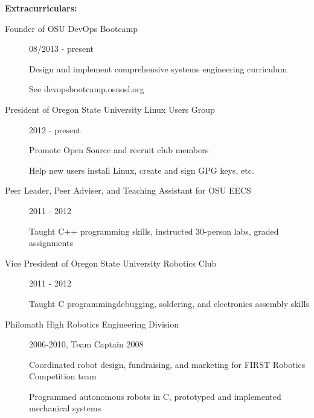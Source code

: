 \documentclass[11pt]{article}
\begin{document}
{\Large \bf Extracurriculars:}
\begin{description}
    \item[Founder of OSU DevOps Bootcamp]
        \hfill 08/2013 - present
        
        Design and implement comprehensive systems engineering curriculum

        See devopsbootcamp.osuosl.org

    \item[President of Oregon State University Linux Users Group]
        \hfill 2012 - present

        Promote Open Source and recruit club members

        Help new users install Linux, create and sign GPG keys, etc.

    \item[Peer Leader, Peer Adviser, and Teaching Assistant for OSU EECS]
        \hfill 2011 - 2012

        Taught C++ programming skills, instructed 30-person labs, graded
        assignments

    \item[Vice President of Oregon State University Robotics Club]
        \hfill 2011 - 2012

        Taught C programming\/debugging, soldering, and electronics assembly skills

    \item[Philomath High Robotics Engineering Division]
        \hfill 2006-2010, Team Captain 2008

        Coordinated robot design, fundraising, and marketing for FIRST
        Robotics Competition team

        Programmed autonomous robots in C, prototyped and implemented
        mechanical systems

\end{description}
\end{document}

